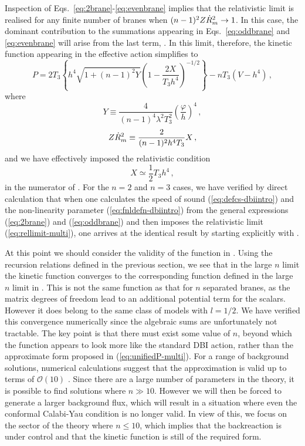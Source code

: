 Inspection of Eqs.~\eqref{eq:2brane}-\eqref{eq:evenbrane} implies that 
the relativistic limit is realised for any finite number of branes when 
$(n-1)^2 Z\dot{R}_m^2 \rightarrow 1$. In this case, the dominant contribution 
to the summations appearing in Eqs.~\eqref{eq:oddbrane} and
\eqref{eq:evenbrane}
will arise from the last term, . In this limit, 
therefore, the kinetic function appearing in the effective action simplifies to 
% 
\begin{equation}
\label{eq:unifiedP-multi}
P = 2T_3 \left\{ h^4 \sqrt{1+(n-1)^2Y} 
\left( 1- \frac{2X}{T_3h^4} \right)^{-1/2} 
 \right\} - n T_3 \left(V - h^4 \right) \,,
\end{equation}
% 
where 
% 
\begin{equation}
\label{eq:defY-multi}
Y \equiv \frac{4}{(n-1)^4 \lambda^2 T_3^2} \left( \frac{\varphi}{h} \right)^4 \,,
\end{equation}
% 
\begin{equation}
\label{eq:defXR2-multi}
Z\dot{R}_m^2 \equiv \frac{2}{(n-1)^2 h^4 T_3}X \,,
\end{equation} 
% 
and we have effectively imposed the relativistic condition 
% 
\begin{equation}
\label{eq:rellimit-multi}
X \simeq \frac{1}{2} T_3 h^4 \,,
\end{equation}
% 
in the numerator of .  
For the $n=2$ and $n=3$ cases, we have verified by direct 
calculation that when one calculates the speed of sound 
(\ref{eq:defcs-dbiintro}) and the non-linearity parameter 
(\ref{eq:fnldefn-dbiintro}) from the general expressions (\ref{eq:2brane}) and (\ref{eq:oddbrane}) 
and then imposes the relativistic
limit (\ref{eq:rellimit-multi}), one arrives at the identical result 
by starting explicitly with .


At this point we should consider the validity of 
the function in . Using the
recursion relations defined in the previous section, 
we see that in the large $n$ limit the kinetic function converges to 
the corresponding function defined in the large $n$ 
limit in . This is not the same function as that for
$n$ separated branes, as the matrix degrees of freedom 
lead to an additional potential term for the scalars. However it does belong
to the same class of models with $l=1/2$. We have 
verified this convergence numerically since the algebraic sums are
unfortunately not tractable. The key point is that there must exist some 
value of $n$, beyond which the function appears to look
more like the standard DBI action, rather than the 
approximate form proposed in (\ref{eq:unifiedP-multi}). For a range of background 
solutions, numerical calculations suggest that the approximation is 
valid up to terms of $\mathcal{O}(10)$ \cite{hltw}. Since there are a large
number of 
parameters in the theory, it is possible to find solutions 
where $n \gg 10$. However we will then be forced to 
generate a larger background flux, which will result 
in a situation where even the conformal 
Calabi-Yau condition is no longer valid. In view of this, we focus on
the sector of the theory where $n \le 10$, which implies that the 
backreaction is under control and that the kinetic function
is still of the required form. 


